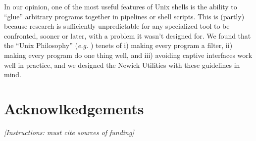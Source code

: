 \documentclass{bioinfo}
\begin{document}
In our opinion, one of the most useful features of Unix shells is the ability
to  ``glue'' arbitrary programs together in pipelines or shell scripts. This
is (partly) because research is sufficiently unpredictable for any specialized
tool to be confronted, sooner or later, with a problem it wasn't designed for.
We found that the ``Unix Philosophy'' (\textit{e.g.} \cite{Gancarz2002})
tenets of i) making every program a filter, ii) making every program do one
thing well, and iii) avoiding captive interfaces work well in practice, and we
designed the Newick Utilities with these guidelines in mind. 

\section*{Acknowlkedgements}
\emph{[Instructions: must cite sources of funding]}

 

\end{document}
